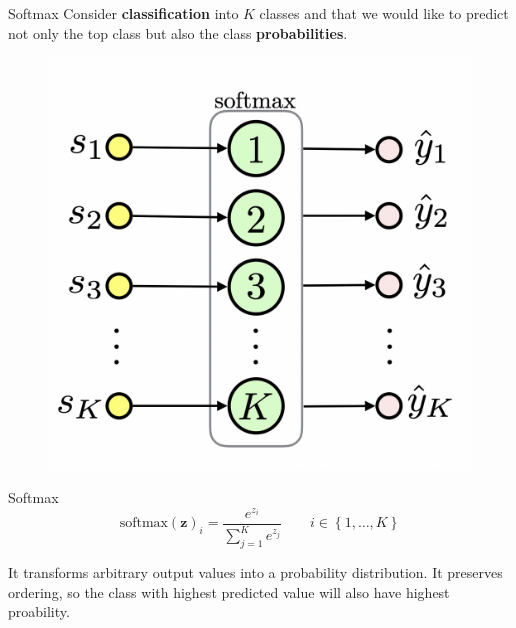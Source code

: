 \documentclass{beamer}
\begin{document}
\begin{frame}{Softmax}
    Consider \textbf{classification} into $K$ classes and that we would like to predict not only the top class but also the class \textbf{probabilities}.

    \begin{minipage}[t]{0.3\textwidth}
        \begin{figure}
            \centering
            \includegraphics[width=\textwidth]{./images/15_softmax.png}
        \end{figure}
    \end{minipage}
    \hfill
    \begin{minipage}[t]{0.65\textwidth}
        \begin{block}{Softmax}
            $$
                \text{softmax}(\boldsymbol{z})_i = \frac{e^{z_i}}{\sum_{j=1}^{K} e^{z_j}} \qquad i \in \left\{1, \dots, K\right\}
            $$
        \end{block}
    \end{minipage}

    It transforms arbitrary output values into a probability distribution.
    It preserves ordering, so the class with highest predicted value will also have highest proability.
\end{frame}
\end{document}
